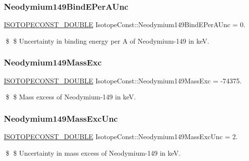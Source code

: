 \subsubsection{\texorpdfstring{Neodymium149\+Bind\+E\+Per\+A\+Unc}{Neodymium149BindEPerAUnc}}
{\footnotesize\ttfamily \mbox{\hyperlink{group___isotope_const-_macros_ga8f45a7272ce02c0b4c65c44636ed719a}{I\+S\+O\+T\+O\+P\+E\+C\+O\+N\+S\+T\+\_\+\+D\+O\+U\+B\+LE}} Isotope\+Const\+::\+Neodymium149\+Bind\+E\+Per\+A\+Unc = 0.}

\$ \$ Uncertainty in binding energy per A of Neodymium-\/149 in keV. \mbox{\label{group___isotope_const-_neodymium-_nd149_ga723d2837d5a39bbaf825508f105f47ae}} 
\subsubsection{\texorpdfstring{Neodymium149\+Mass\+Exc}{Neodymium149MassExc}}
{\footnotesize\ttfamily \mbox{\hyperlink{group___isotope_const-_macros_ga8f45a7272ce02c0b4c65c44636ed719a}{I\+S\+O\+T\+O\+P\+E\+C\+O\+N\+S\+T\+\_\+\+D\+O\+U\+B\+LE}} Isotope\+Const\+::\+Neodymium149\+Mass\+Exc = -\/74375.}

\$ \$ Mass excess of Neodymium-\/149 in keV. \mbox{\label{group___isotope_const-_neodymium-_nd149_gae8f868c1cafdf1606cd1c7a3465e4843}} 
\subsubsection{\texorpdfstring{Neodymium149\+Mass\+Exc\+Unc}{Neodymium149MassExcUnc}}
{\footnotesize\ttfamily \mbox{\hyperlink{group___isotope_const-_macros_ga8f45a7272ce02c0b4c65c44636ed719a}{I\+S\+O\+T\+O\+P\+E\+C\+O\+N\+S\+T\+\_\+\+D\+O\+U\+B\+LE}} Isotope\+Const\+::\+Neodymium149\+Mass\+Exc\+Unc = 2.}

\$ \$ Uncertainty in mass excess of Neodymium-\/149 in keV. \mbox{\label{group___isotope_const-_neodymium-_nd149_ga91c16a3af0b89b02246fdb759c967365}} 
